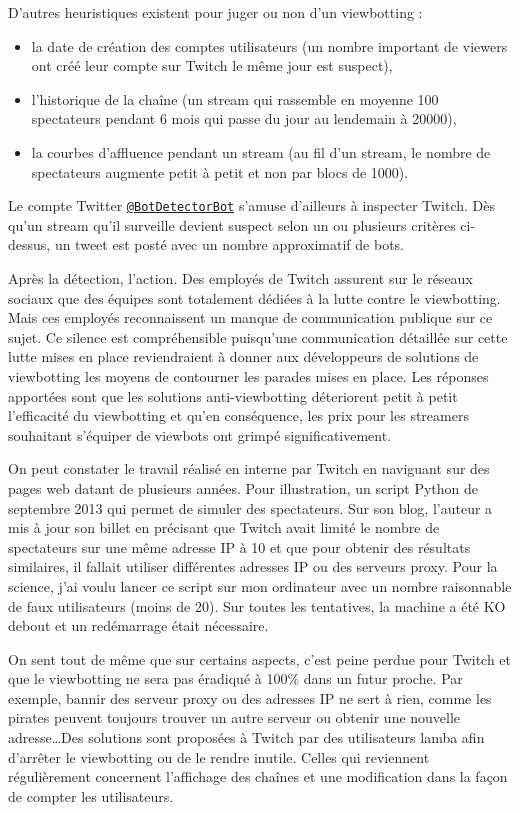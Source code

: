 \documentclass[a4paper]{article}
\begin{document}
D'autres heuristiques existent pour juger ou non d'un viewbotting :
\begin{itemize}
\item la date de création des comptes utilisateurs (un nombre important de viewers ont créé leur compte sur Twitch le même jour est suspect),
\item l'historique de la chaîne (un stream qui rassemble en moyenne 100 spectateurs pendant 6 mois qui passe du jour au lendemain à 20000),
\item la courbes d'affluence pendant un stream (au fil d'un stream, le nombre de spectateurs augmente petit à petit et non par blocs de 1000).
\end{itemize}
Le compte Twitter \href{https://twitter.com/botdetectorbot}{\texttt{@BotDetectorBot}} s'amuse d'ailleurs à inspecter Twitch. Dès qu'un stream qu'il surveille devient suspect selon un ou plusieurs critères ci-dessus, un tweet est posté avec un nombre approximatif de bots.

Après la détection, l'action. Des employés de Twitch assurent sur le réseaux sociaux que des équipes sont totalement dédiées à la lutte contre le viewbotting. Mais ces employés reconnaissent un manque de communication publique sur ce sujet. Ce silence est compréhensible puisqu'une communication détaillée sur cette lutte mises en place reviendraient à donner aux développeurs de solutions de viewbotting les moyens de contourner les parades mises en place. Les réponses apportées sont que les solutions anti-viewbotting déteriorent petit à petit l'efficacité du viewbotting et qu'en conséquence, les prix pour les streamers souhaitant s'équiper de viewbots ont grimpé significativement\cite{RedditJan2015}. 

On peut constater le travail réalisé en interne par Twitch en naviguant sur des pages web datant de plusieurs années. Pour illustration, un script Python de septembre 2013 qui permet de simuler des spectateurs. Sur son blog, l'auteur a mis à jour son billet en précisant que Twitch avait limité le nombre de spectateurs sur une même adresse IP à 10 et que pour obtenir des résultats similaires, il fallait utiliser différentes adresses IP ou des serveurs proxy\cite{Zhang2013}. Pour la science, j'ai voulu lancer ce script sur mon ordinateur avec un nombre raisonnable de faux utilisateurs (moins de 20). Sur toutes les tentatives, la machine a été KO debout et un redémarrage était nécessaire.

On sent tout de même que sur certains aspects, c'est peine perdue pour Twitch et que le viewbotting ne sera pas éradiqué à 100\% dans un futur proche. Par exemple, bannir des serveur proxy ou des adresses IP ne sert à rien, comme les pirates peuvent toujours trouver un autre serveur ou obtenir une nouvelle adresse\ldots Des solutions sont proposées à Twitch par des utilisateurs lamba afin d'arrêter le viewbotting ou de le rendre inutile. Celles qui reviennent régulièrement concernent l'affichage des chaînes et une modification dans la façon de compter les utilisateurs.
\end{document}
